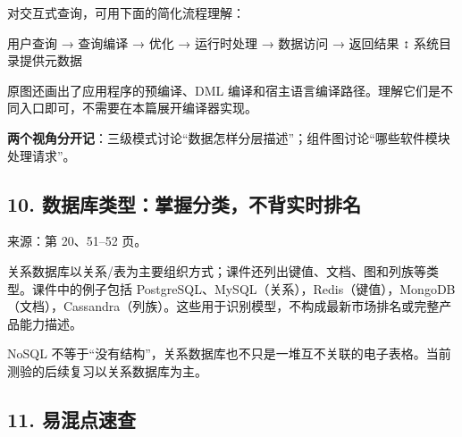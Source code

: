 对交互式查询，可用下面的简化流程理解：

\begin{StudyCode}
用户查询 → 查询编译 → 优化 → 运行时处理 → 数据访问 → 返回结果
                            ↕
                      系统目录提供元数据
\end{StudyCode}

原图还画出了应用程序的预编译、DML 编译和宿主语言编译路径。理解它们是不同入口即可，不需要在本篇展开编译器实现。

\textbf{两个视角分开记}：三级模式讨论``数据怎样分层描述''；组件图讨论``哪些软件模块处理请求''。

\subsection{10. 数据库类型：掌握分类，不背实时排名}\label{01_database_fundamentals_zh-ux6570ux636eux5e93ux7c7bux578bux638cux63e1ux5206ux7c7bux4e0dux80ccux5b9eux65f6ux6392ux540d}

来源：第 20、51--52 页。

关系数据库以关系/表为主要组织方式；课件还列出键值、文档、图和列族等类型。课件中的例子包括 PostgreSQL、MySQL（关系），Redis（键值），MongoDB（文档），Cassandra（列族）。这些用于识别模型，不构成最新市场排名或完整产品能力描述。

NoSQL 不等于``没有结构''，关系数据库也不只是一堆互不关联的电子表格。当前测验的后续复习以关系数据库为主。

\subsection{11. 易混点速查}\label{01_database_fundamentals_zh-ux6613ux6df7ux70b9ux901fux67e5}

